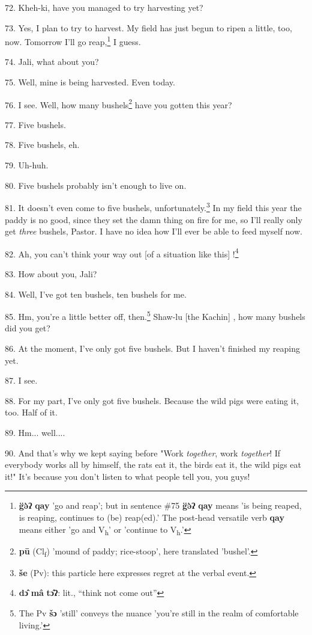 72. Kheh-ki, have you managed to try harvesting yet?

73. Yes, I plan to try to harvest. My field has just begun to ripen a little, too,
now. Tomorrow I'll go reap,\footnote{\textbf{g̈ə̀ʔ} \textbf{qay} 'go and reap'; but in sentence \#75 \textbf{g̈ə̀ʔ} \textbf{qay} means 'is being reaped, is reaping, continues to (be) reap(ed).' The post-head versatile verb \textbf{qay} means either 'go and V\textsubscript{h}' or 'continue to V\textsubscript{h}.'} I guess.

74. Jali, what about you?

75. Well, mine is being harvested. Even today.

76. I see. Well, how many bushels\footnote{\textbf{pū} (Cl\textsubscript{f}) 'mound of paddy; rice-stoop', here translated 'bushel'.} have you gotten this year?

77. Five bushels.

78. Five bushels, eh.

79. Uh-huh.

80. Five bushels probably isn't enough to live on.

81. It doesn't even come to five bushels, unfortunately.\footnote{\textbf{še} (Pv): this particle here expresses regret at the verbal event.} In my field this
year the paddy is no good, since they set the damn thing on fire for me, so I'll
really only get \textit{three} bushels, Pastor. I have no idea how I'll ever be
able to feed myself now.

82. Ah, you can't think your way out [of a situation like this] !\footnote{\textbf{dɔ̂} \textbf{mâ} \textbf{tɔ̂ʔ}: lit., ``think not come out''}

83. How about you, Jali?

84. Well, I've got ten bushels, ten bushels for me.

85. Hm, you're a little better off, then.\footnote{The Pv \textbf{šɔ} 'still' conveys the nuance 'you're still in the realm of comfortable living.'} Shaw-lu [the Kachin] , how many
bushels did you get?

86. At the moment, I've only got five bushels. But I haven't finished my reaping
yet.

87. I see.

88. For my part, I've only got five bushels. Because the wild pigs were eating
it, too. Half of it.

89. Hm... well....

90. And that's why we kept saying before "Work\textit{ together}, work
\textit{together}! If everybody works all by himself, the rats eat it, the birds
eat it, the wild pigs eat it!" It's because you don't listen to what people
tell you, you guys!

